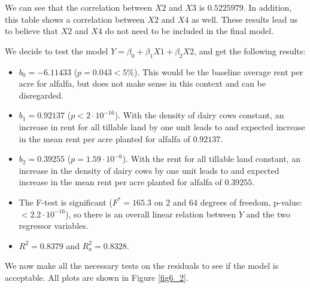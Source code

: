\documentclass[]{article}
\begin{document}
 We can see that the correlation between $X2$ and $X3$ is $0.5225979$. In addition, this table shows a correlation between $X2$ and $X4$ as well. These results lead us to believe that $X2$ and $X4$ do not need to be included in the final model.

 We decide to test the model $Y = \beta_0 + \beta_1 X1 + \beta_2 X2$, and get the following results:

 \begin{itemize}
 \item $b_0 = -6.11433$ ($p = 0.043 < 5\%$). This would be the baseline average rent per acre for alfalfa, but does not make sense in this context and can be disregarded.
 \item $b_1 = 0.92137$ ($p < 2 \cdot 10^{-16}$). With the density of dairy cows constant, an increase in rent for all tillable land by one unit leads to and expected increase in the mean rent per acre planted for alfalfa of $0.92137$.
 \item $b_2 = 0.39255$ ($p = 1.59 \cdot 10^{-6}$). With the rent for all tillable land constant, an increase in the density of dairy cows by one unit leads to and expected increase in the mean rent per acre planted for alfalfa of $0.39255$.
 \item The F-test is significant ($F^* = 165.3$ on 2 and 64 degrees of freedom, p-value: $< 2.2 \cdot 10^{-16}$), so there is an overall linear relation between $Y$ and the two regressor variables.
 \item $R^2 = 0.8379$ and $R^2_a = 0.8328$.
 \end{itemize}

 We now make all the necessary tests on the residuals to see if the model is acceptable. All plots are shown in Figure \ref{fig6_2}.
\end{document}

